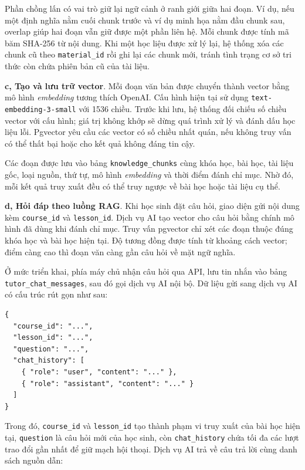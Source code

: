 \documentclass[../DoAn.tex]{subfiles}
\begin{document}
Phần chồng lấn có vai trò giữ lại ngữ cảnh ở ranh giới giữa hai đoạn. Ví dụ, nếu một định nghĩa nằm cuối chunk trước và ví dụ minh họa nằm đầu chunk sau, overlap giúp hai đoạn vẫn giữ được một phần liên hệ. Mỗi chunk được tính mã băm SHA-256 từ nội dung. Khi một học liệu được xử lý lại, hệ thống xóa các chunk cũ theo \texttt{material\_id} rồi ghi lại các chunk mới, tránh tình trạng cơ sở tri thức còn chứa phiên bản cũ của tài liệu.

\textbf{c, Tạo và lưu trữ vector}. Mỗi đoạn văn bản được chuyển thành vector bằng mô hình \textit{embedding} tương thích OpenAI. Cấu hình hiện tại sử dụng \texttt{text-embedding-3-small} với 1536 chiều. Trước khi lưu, hệ thống đối chiếu số chiều vector với cấu hình; giá trị không khớp sẽ dừng quá trình xử lý và đánh dấu học liệu lỗi. Pgvector yêu cầu các vector có số chiều nhất quán, nếu không truy vấn có thể thất bại hoặc cho kết quả không đáng tin cậy.

Các đoạn được lưu vào bảng \texttt{knowledge\_chunks} cùng khóa học, bài học, tài liệu gốc, loại nguồn, thứ tự, mô hình \textit{embedding} và thời điểm đánh chỉ mục. Nhờ đó, mỗi kết quả truy xuất đều có thể truy ngược về bài học hoặc tài liệu cụ thể.

\textbf{d, Hỏi đáp theo luồng RAG}. Khi học sinh đặt câu hỏi, giao diện gửi nội dung kèm \texttt{course\_id} và \texttt{lesson\_id}. Dịch vụ AI tạo vector cho câu hỏi bằng chính mô hình đã dùng khi đánh chỉ mục. Truy vấn pgvector chỉ xét các đoạn thuộc đúng khóa học và bài học hiện tại. Độ tương đồng được tính từ khoảng cách vector; điểm càng cao thì đoạn văn càng gần câu hỏi về mặt ngữ nghĩa.

Ở mức triển khai, phía máy chủ nhận câu hỏi qua API, lưu tin nhắn vào bảng \texttt{tutor\_chat\_messages}, sau đó gọi dịch vụ AI nội bộ. Dữ liệu gửi sang dịch vụ AI có cấu trúc rút gọn như sau:

\begin{verbatim}
{
  "course_id": "...",
  "lesson_id": "...",
  "question": "...",
  "chat_history": [
    { "role": "user", "content": "..." },
    { "role": "assistant", "content": "..." }
  ]
}
\end{verbatim}

Trong đó, \texttt{course\_id} và \texttt{lesson\_id} tạo thành phạm vi truy xuất của bài học hiện tại, \texttt{question} là câu hỏi mới của học sinh, còn \texttt{chat\_history} chứa tối đa các lượt trao đổi gần nhất để giữ mạch hội thoại. Dịch vụ AI trả về câu trả lời cùng danh sách nguồn dẫn:
\end{document}
